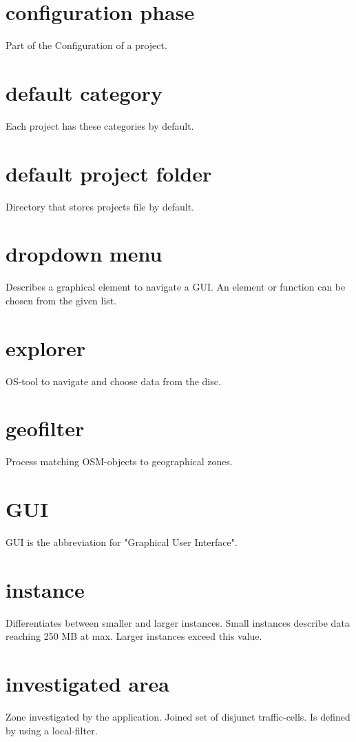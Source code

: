 \documentclass[parskip=full]{report} %
\begin{document}
\section*{configuration phase}
Part of the Configuration of a project.

\section*{default category}
Each project has these categories by default.

\section*{default project folder}
Directory that stores projects file by default.

\section*{dropdown menu}
Describes a graphical element to navigate a GUI. An element or function can be chosen from the given list.

\section*{explorer}
OS-tool to navigate and choose data from the disc.

\section*{geofilter}
Process matching OSM-objects to geographical zones.

\section*{GUI}
GUI is the abbreviation for "Graphical User Interface".

\section*{instance}
Differentiates between smaller and larger instances. Small instances describe data reaching 250 MB at max. Larger instances exceed this value.

\section*{investigated area}
Zone investigated by the application. Joined set of disjunct traffic-cells. Is defined by using a local-filter.
\end{document}
